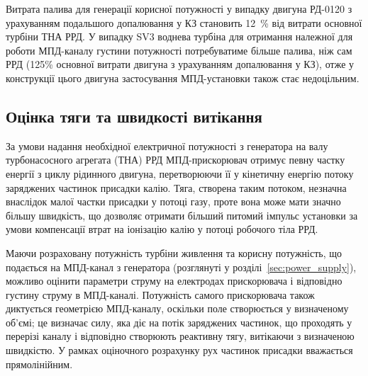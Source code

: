 Витрата палива для генерації корисної потужності у випадку двигуна РД-0120 з урахуванням подальшого допалювання у КЗ становить 12~\% від витрати основної турбіни ТНА РРД. У випадку SV3 воднева турбіна для отримання належної для роботи МПД-каналу густини потужності потребуватиме більше палива, ніж сам РРД (125\% основної витрати двигуна з урахуванням допалювання у КЗ), отже у конструкції цього двигуна застосування МПД-установки також стає недоцільним.




\subsection{Оцінка тяги та швидкості витікання}



За умови надання необхідної електричної потужності з генератора на валу турбонасосного агрегата (ТНА) РРД МПД-прискорювач отримує певну частку енергії з циклу рідинного двигуна, перетворюючи її у кінетичну енергію потоку заряджених частинок присадки калію. Тяга, створена таким потоком, незначна внаслідок малої частки присадки у потоці газу, проте вона може мати значно більшу швидкість, що дозволяє отримати більший питомий імпульс установки за умови компенсації втрат на іонізацію калію у потоці робочого тіла РРД.

Маючи розраховану потужність турбіни живлення та корисну потужність, що подається на МПД-канал з генератора (розглянуті у розділі~\ref{sec:power_supply}), можливо оцінити параметри струму на електродах прискорювача і відповідно густину струму в МПД-каналі. Потужність самого прискорювача також диктується геометрією МПД-каналу, оскільки поле створюється у визначеному об'ємі; це визначає силу, яка діє на потік заряджених частинок, що проходять у перерізі каналу і відповідно створюють реактивну тягу, витікаючи з визначеною швидкістю. У рамках оціночного розрахунку рух частинок присадки вважається прямолінійним.

